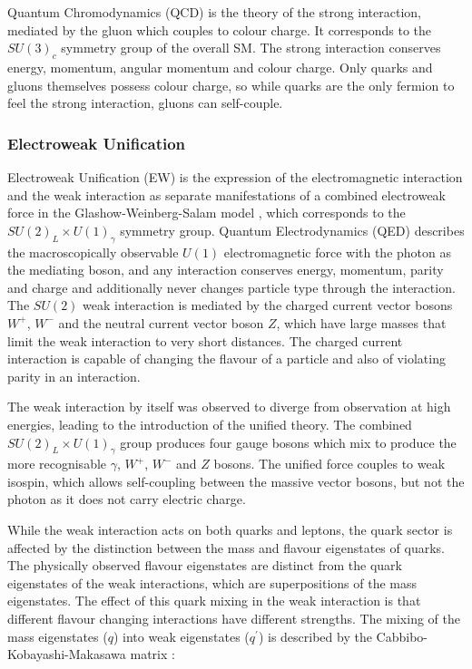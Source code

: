 		Quantum Chromodynamics (QCD) is the theory of the strong interaction, mediated by the gluon which couples to colour charge. It corresponds to the $SU(3)_c$ symmetry group of the overall SM. The strong interaction conserves energy, momentum, angular momentum and colour charge. Only quarks and gluons themselves possess colour charge, so while quarks are the only fermion to feel the strong interaction, gluons can self-couple.

		\subsubsection{Electroweak Unification}

		Electroweak Unification (EW) is the expression of the electromagnetic interaction and the weak interaction as separate manifestations of a combined electroweak force in the Glashow-Weinberg-Salam model \cite{gws-g, gws-w, gws-s}, which corresponds to the $SU(2)_L\times U(1)_\gamma$ symmetry group. Quantum Electrodynamics (QED) describes the macroscopically observable $U(1)$ electromagnetic force  with the photon as the mediating boson, and any interaction conserves energy, momentum, parity and charge and additionally never changes particle type through the interaction. The $SU(2)$ weak interaction is mediated by the charged current vector bosons $W^+$, $W^-$ and the neutral current vector boson $Z$, which have large masses that limit the weak interaction to very short distances. The charged current interaction is capable of changing the flavour of a particle and also of violating parity in an interaction.

		The weak interaction by itself was observed to diverge from observation at high energies, leading to the introduction of the unified theory. The combined  $SU(2)_L\times U(1)_\gamma$ group produces four gauge bosons which mix to produce the more recognisable $\gamma$, $W^+$, $W^-$  and $Z$ bosons. The unified force couples to weak isospin, which allows self-coupling between the massive vector bosons, but not the photon as it does not carry electric charge.

		While the weak interaction acts on both quarks and leptons, the quark sector is affected by the distinction between the mass and flavour eigenstates of quarks. The physically observed flavour eigenstates are distinct from the quark eigenstates of the weak interactions, which are superpositions of the mass eigenstates. The effect of this quark mixing in the weak interaction is that different flavour changing interactions have different strengths. The mixing of the mass eigenstates ($q$) into weak eigenstates ($q^\prime$) is described by the Cabbibo-Kobayashi-Makasawa matrix \cite{ckm-c, ckm-km}:

